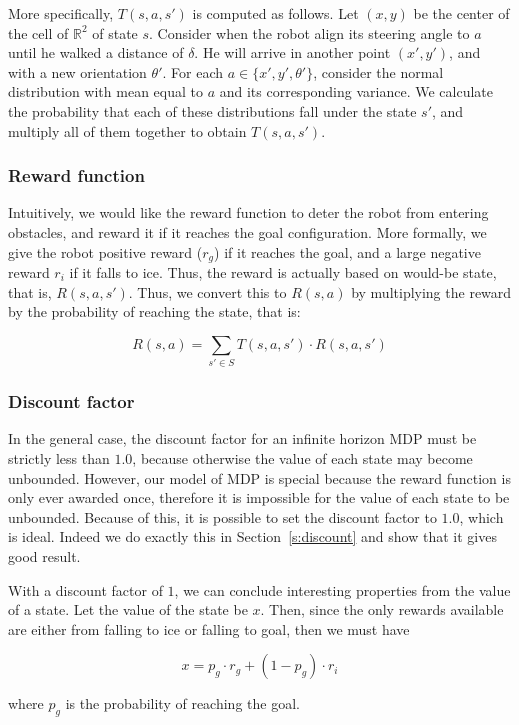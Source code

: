\documentclass[10pt,a4paper,oneside]{article}
\begin{document}
More specifically, $T(s, a, s')$ is computed as follows. Let $(x, y)$ be the
center of the cell of $\mathbb{R}^2$ of state $s$. Consider when the robot
align its steering angle to $a$ until he walked a distance of $\delta$. He
will arrive in another point $(x', y')$, and with a new orientation $\theta'$.
For each $a \in \{x', y', \theta'\}$, consider the normal distribution
with mean equal to $a$ and its corresponding variance. We calculate the probability
that each of these distributions fall under the state $s'$, and multiply all
of them together to obtain $T(s, a, s')$.

\subsubsection{Reward function}
\label{sec:r}
Intuitively, we would like the reward function to deter the robot from entering
obstacles, and reward it if it reaches the goal configuration. More formally,
we give the robot positive reward ($r_g$) if it reaches the goal, and a large negative
reward $r_i$ if it falls to ice. Thus, the reward is actually based on would-be state,
that is, $R(s, a, s')$. Thus, we convert this to $R(s, a)$ by multiplying the
reward by the probability of reaching the state, that is:

\[ R(s, a) = \sum_{s' \in S} T(s, a, s') \cdot R(s, a, s') \]

\subsubsection{Discount factor}

In the general case, the discount factor for an infinite horizon MDP must be
strictly less than $1.0$, because otherwise the value of each state may become
unbounded. However, our model of MDP is special because the reward function is
only ever awarded once, therefore it is impossible for the value of each state
to be unbounded. Because of this, it is possible to set the discount factor to
$1.0$, which is ideal. Indeed we do exactly this in Section~\ref{s:discount}
and show that it gives good result.

With a discount factor of $1$, we can conclude interesting properties from the
value of a state. Let the value of the state be $x$. Then, since the only
rewards available are either from falling to ice or falling to goal, then we
must have

$$x = p_g \cdot r_g + (1 - p_g) \cdot r_i$$

where $p_g$ is the probability of reaching the goal.
\end{document}
